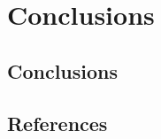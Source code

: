\documentclass[ review  , 3p ]{elsarticle}
\begin{document}
  \hypertarget{conclusions}{%
  \section{Conclusions}\label{conclusions}}

  \hypertarget{conclusions-1}{%
  \subsection{Conclusions}\label{conclusions-1}}

  \clearpage

  \hypertarget{references}{%
  \subsection*{References}\label{references}}
\end{document}
